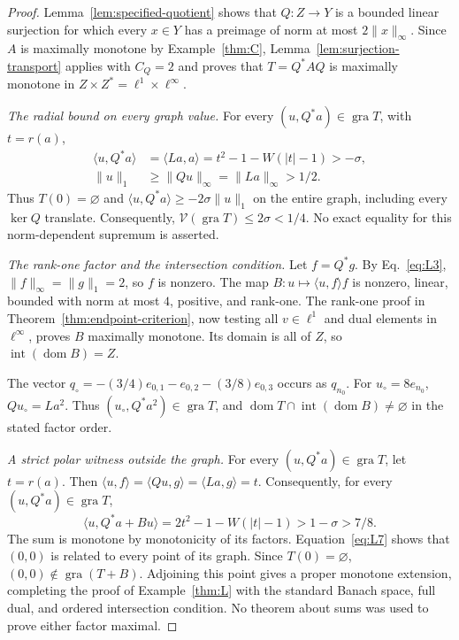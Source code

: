 \documentclass[11pt]{article}
\newcommand{\gra}{\operatorname{gra}}
\newcommand{\dom}{\operatorname{dom}}
\newcommand{\pair}[2]{\langle #1,#2\rangle}
\theoremstyle{definition}
\theoremstyle{remark}
\begin{document}
\begin{proof}
Lemma~\ref{lem:specified-quotient} shows that $Q:Z\to Y$ is a bounded
linear surjection for which every $x\in Y$ has a preimage of norm at most
$2\|x\|_\infty$. Since $A$ is maximally monotone by Example~\ref{thm:C},
Lemma~\ref{lem:surjection-transport} applies with $C_Q=2$ and proves that
$T=Q^*AQ$ is maximally monotone in $Z\times Z^*=\ell^1\times\ell^\infty$.

\noindent\textit{The radial bound on every graph value.}
\label{sec:L3}
For every $(u,Q^*a)\in\gra T$, with $t=r(a)$,
\begin{equation}
\begin{aligned}
\pair{u}{Q^*a}&=\pair{La}{a}
 =t^2-1-W(|t|-1)>-\sigma,\\
\|u\|_1&\ge\|Qu\|_\infty=\|La\|_\infty>1/2.
\end{aligned}
\label{eq:L6}
\end{equation}
Thus $T(0)=\varnothing$ and $\pair{u}{Q^*a}\ge-2\sigma\|u\|_1$ on
the entire graph, including every $\ker Q$ translate. Consequently,
$\mathcal V(\gra T)\le2\sigma<1/4$. No exact equality for this
norm-dependent supremum is asserted.

\noindent\textit{The rank-one factor and the intersection condition.}
\label{sec:L4}
Let $f=Q^*g$. By Eq.~\eqref{eq:L3}, $\|f\|_\infty=\|g\|_1=2$, so $f$
is nonzero. The map $B:u\mapsto\pair{u}{f}f$ is nonzero, linear, bounded
with norm at most $4$, positive, and rank-one. The rank-one proof in
Theorem~\ref{thm:endpoint-criterion}, now testing all $v\in\ell^1$
and dual elements in $\ell^\infty$, proves $B$ maximally monotone.
Its domain is all of $Z$, so $\operatorname{int}(\dom B)=Z$.

The vector $q_\circ=-(3/4)e_{0,1}-e_{0,2}-(3/8)e_{0,3}$ occurs as
$q_{n_0}$. For $u_\circ=8e_{n_0}$, $Qu_\circ=La^2$.
Thus $(u_\circ,Q^*a^2)\in\gra T$, and
$\dom T\cap\operatorname{int}(\dom B)\ne\varnothing$ in the stated
factor order.

\noindent\textit{A strict polar witness outside the graph.}
\label{sec:L5}
For every $(u,Q^*a)\in\gra T$, let $t=r(a)$. Then
$\pair{u}{f}=\pair{Qu}{g}=\pair{La}{g}=t$.
Consequently, for every $(u,Q^*a)\in\gra T$,
\begin{equation}
\pair{u}{Q^*a+Bu}
 =2t^2-1-W(|t|-1)>1-\sigma>7/8.
\label{eq:L7}
\end{equation}
The sum is monotone by monotonicity of its factors.
Equation~\eqref{eq:L7} shows that $(0,0)$ is related to every point of its graph.
Since $T(0)=\varnothing$, $(0,0)\notin\gra(T+B)$. Adjoining this point
gives a proper monotone extension, completing the proof of
Example~\ref{thm:L} with the standard Banach space, full dual, and ordered
intersection condition. No theorem about sums was used to prove either
factor maximal.
\end{proof}
\end{document}
